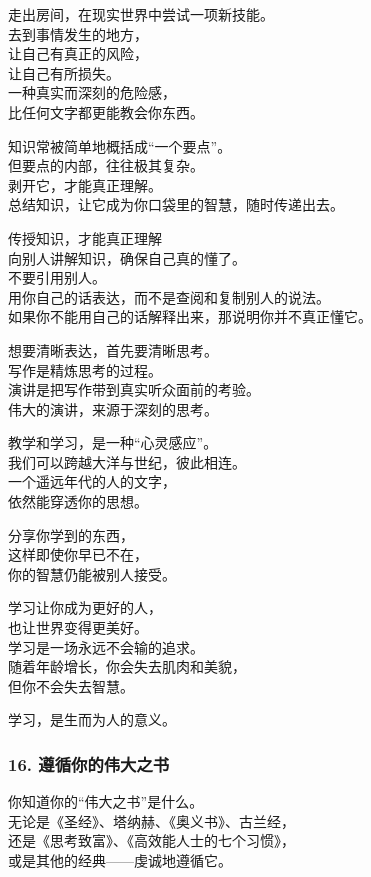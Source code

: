 \documentclass[
]{article}
\begin{document}
走出房间，在现实世界中尝试一项新技能。\\
去到事情发生的地方，\\
让自己有真正的风险，\\
让自己有所损失。\\
一种真实而深刻的危险感，\\
比任何文字都更能教会你东西。

知识常被简单地概括成``一个要点''。\\
但要点的内部，往往极其复杂。\\
剥开它，才能真正理解。\\
总结知识，让它成为你口袋里的智慧，随时传递出去。

传授知识，才能真正理解\\
向别人讲解知识，确保自己真的懂了。\\
不要引用别人。\\
用你自己的话表达，而不是查阅和复制别人的说法。\\
如果你不能用自己的话解释出来，那说明你并不真正懂它。

想要清晰表达，首先要清晰思考。\\
写作是精炼思考的过程。\\
演讲是把写作带到真实听众面前的考验。\\
伟大的演讲，来源于深刻的思考。

教学和学习，是一种``心灵感应''。\\
我们可以跨越大洋与世纪，彼此相连。\\
一个遥远年代的人的文字，\\
依然能穿透你的思想。

分享你学到的东西，\\
这样即使你早已不在，\\
你的智慧仍能被别人接受。

学习让你成为更好的人，\\
也让世界变得更美好。\\
学习是一场永远不会输的追求。\\
随着年龄增长，你会失去肌肉和美貌，\\
但你不会失去智慧。

学习，是生而为人的意义。

\subsubsection{16.
遵循你的伟大之书}\label{16-ux9075ux5faaux4f60ux7684ux4f1fux5927ux4e4bux4e66}

你知道你的``伟大之书''是什么。\\
无论是《圣经》、塔纳赫、《奥义书》、古兰经，\\
还是《思考致富》、《高效能人士的七个习惯》，\\
或是其他的经典------虔诚地遵循它。
\end{document}
